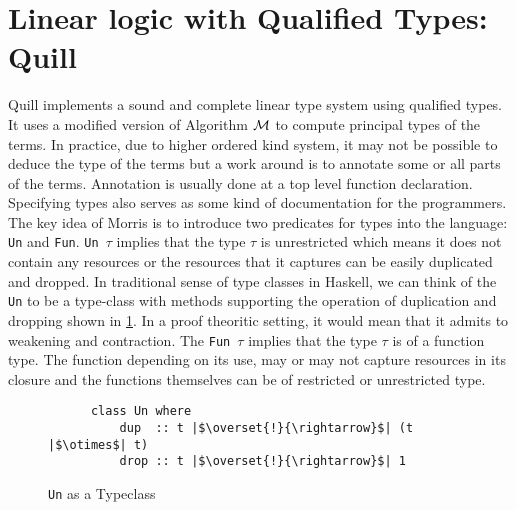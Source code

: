 \section{Linear logic with Qualified Types: Quill}\label{sec:quill}
Quill \citep{morris_best_2016} implements a sound and complete linear type system using qualified types.
It uses a modified version of Algorithm $\mathcal{M}$ to compute principal types of the terms.
In practice, due to higher ordered kind system, it may not be possible to deduce the
type of the terms but a work around is to annotate some or all parts of
the terms. Annotation is usually done at a top level function declaration. Specifying types
also serves as some kind of documentation for the programmers.
The key idea of Morris is to introduce two predicates for types into the language: \texttt{Un} and \texttt{Fun}.
\texttt{Un $\tau$} implies that the type $\tau$ is unrestricted which means it does not
contain any resources or the resources that it captures can be easily duplicated and dropped.
In traditional sense of type classes in Haskell, we can think of the \texttt{Un} to be a type-class with methods supporting the operation
of duplication and dropping shown in \cref{fig:un-typeclass}. In a proof theoritic setting, it would mean
that it admits to weakening and contraction.
The \texttt{Fun $\tau$} implies that the type $\tau$ is of a function type. The function
depending on its use, may or may not capture resources in its closure and the functions
themselves can be of restricted or unrestricted type.
\begin{figure}[h]
  \centering
  \begin{framed}\centering
    \begin{verbatim}
      class Un where
          dup  :: t |$\overset{!}{\rightarrow}$| (t |$\otimes$| t)
          drop :: t |$\overset{!}{\rightarrow}$| 1
    \end{verbatim}
  \end{framed}
  \caption{\texttt{Un} as a Typeclass}
  \label{fig:un-typeclass}
\end{figure}

